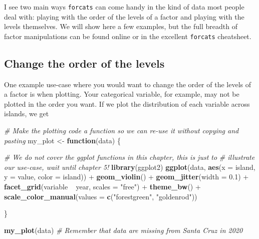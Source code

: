 \documentclass[]{book}
\newenvironment{Shaded}{}{}
\newcommand{\CommentTok}[1]{\textcolor[rgb]{0.38,0.63,0.69}{\textit{#1}}}
\newcommand{\ControlFlowTok}[1]{\textcolor[rgb]{0.00,0.44,0.13}{\textbf{#1}}}
\newcommand{\DataTypeTok}[1]{\textcolor[rgb]{0.56,0.13,0.00}{#1}}
\newcommand{\FloatTok}[1]{\textcolor[rgb]{0.25,0.63,0.44}{#1}}
\newcommand{\KeywordTok}[1]{\textcolor[rgb]{0.00,0.44,0.13}{\textbf{#1}}}
\newcommand{\NormalTok}[1]{#1}
\newcommand{\OperatorTok}[1]{\textcolor[rgb]{0.40,0.40,0.40}{#1}}
\newcommand{\StringTok}[1]{\textcolor[rgb]{0.25,0.44,0.63}{#1}}
\begin{document}
I see two main ways \texttt{forcats} can come handy in the kind of data most people deal with: playing with the order of the levels of a factor and playing with the levels themselves. We will show here a few examples, but the full breadth of factor manipulations can be found online or in the excellent \texttt{forcats} cheatsheet.

\hypertarget{change-the-order-of-the-levels}{%
\subsection{Change the order of the levels}\label{change-the-order-of-the-levels}}

One example use-case where you would want to change the order of the levels of a factor is when plotting. Your categorical variable, for example, may not be plotted in the order you want. If we plot the distribution of each variable across islands, we get

\begin{Shaded}
\begin{Highlighting}[]
\CommentTok{# Make the plotting code a function so we can re-use it without copying and pasting}
\NormalTok{my_plot <-}\StringTok{ }\ControlFlowTok{function}\NormalTok{(data) \{}

  \CommentTok{# We do not cover the ggplot functions in this chapter, this is just to}
  \CommentTok{# illustrate our use-case, wait until chapter 5!}
  \KeywordTok{library}\NormalTok{(ggplot2)}
  \KeywordTok{ggplot}\NormalTok{(data, }\KeywordTok{aes}\NormalTok{(}\DataTypeTok{x =}\NormalTok{ island, }\DataTypeTok{y =}\NormalTok{ value, }\DataTypeTok{color =}\NormalTok{ island)) }\OperatorTok{+}
\StringTok{    }\KeywordTok{geom_violin}\NormalTok{() }\OperatorTok{+}
\StringTok{    }\KeywordTok{geom_jitter}\NormalTok{(}\DataTypeTok{width =} \FloatTok{0.1}\NormalTok{) }\OperatorTok{+}
\StringTok{    }\KeywordTok{facet_grid}\NormalTok{(variable }\OperatorTok{~}\StringTok{ }\NormalTok{year, }\DataTypeTok{scales =} \StringTok{"free"}\NormalTok{) }\OperatorTok{+}
\StringTok{    }\KeywordTok{theme_bw}\NormalTok{() }\OperatorTok{+}
\StringTok{    }\KeywordTok{scale_color_manual}\NormalTok{(}\DataTypeTok{values =} \KeywordTok{c}\NormalTok{(}\StringTok{"forestgreen"}\NormalTok{, }\StringTok{"goldenrod"}\NormalTok{))}

\NormalTok{\}}

\KeywordTok{my_plot}\NormalTok{(data)}
\CommentTok{# Remember that data are missing from Santa Cruz in 2020}
\end{Highlighting}
\end{Shaded}
\end{document}

